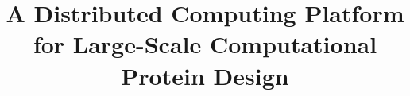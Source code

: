 \documentclass{article}
\begin{document}
\begin{spacing}{2.0}

\title{\huge \bf A Distributed Computing Platform for Large-Scale Computational Protein Design}
\date{}
\author{}

\maketitle















\end{spacing}
\end{document}

